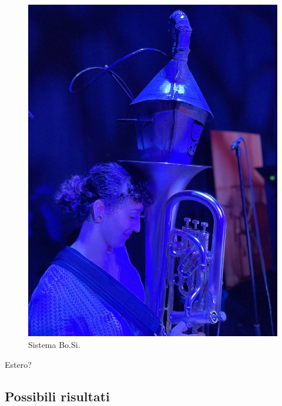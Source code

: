 \documentclass{gs-adonis}
\begin{document}
\begin{figure}[ht]
  \centering
  \includegraphics[width=\linewidth]{images/IMG_F5A47D566D6E-31.jpeg}
  \captionsetup{width=.81\linewidth}
  \caption{Sistema Bo.Si.}
  \label{bosi}
\end{figure}

Estero?



\subsection{Possibili risultati}%
\end{document}
